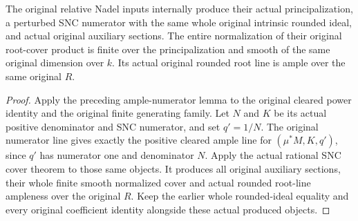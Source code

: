 \begin{theorem}
\label{thm:kn-relative-nadel-numerator-cover}
\leanok
{}
The original relative Nadel inputs internally produce their actual
principalization, a perturbed SNC numerator with the same whole original
intrinsic rounded ideal, and actual original auxiliary sections.  The
entire normalization of their original root-cover product is finite over
the principalization and smooth of the same original dimension over $k$.
Its actual original rounded root line is ample over the same original $R$.
\end{theorem}
\begin{proof}
Apply the preceding ample-numerator lemma to the original cleared power
identity and the original finite generating family.  Let $N$ and $K$
be its actual positive denominator and SNC numerator, and set $q'=1/N$.
The original numerator line gives exactly the positive cleared ample
line for $(\mu^*M,K,q')$, since $q'$ has numerator one and denominator
$N$.  Apply the actual rational SNC cover theorem to those same objects.
It produces all original auxiliary sections, their whole finite smooth
normalized cover and actual rounded root-line ampleness over the original
$R$.  Keep the earlier whole rounded-ideal equality and every original
coefficient identity alongside these actual produced objects.
\end{proof}
